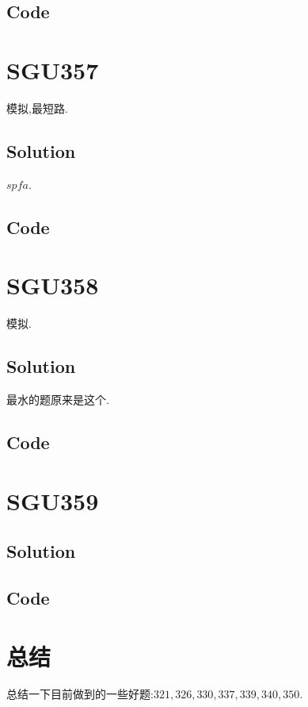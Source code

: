 \documentclass{article}
\newcommand{\includecode}[2][c]{}
\begin{document}
\begin{flushleft}
\subsection{Code}
\includecode[C++]{355.cc}

\section{SGU357}
模拟,最短路.
\subsection{Solution}
$spfa$.
\subsection{Code}
\includecode[C++]{357.cc}

\section{SGU358}
模拟.
\subsection{Solution}
最水的题原来是这个.
\subsection{Code}
\includecode[C++]{358.cc}

\section{SGU359}

\subsection{Solution}

\subsection{Code}

\section{总结}
总结一下目前做到的一些好题:$321,326,330,337,339,340,350$.


\end{flushleft}
\end{document}
